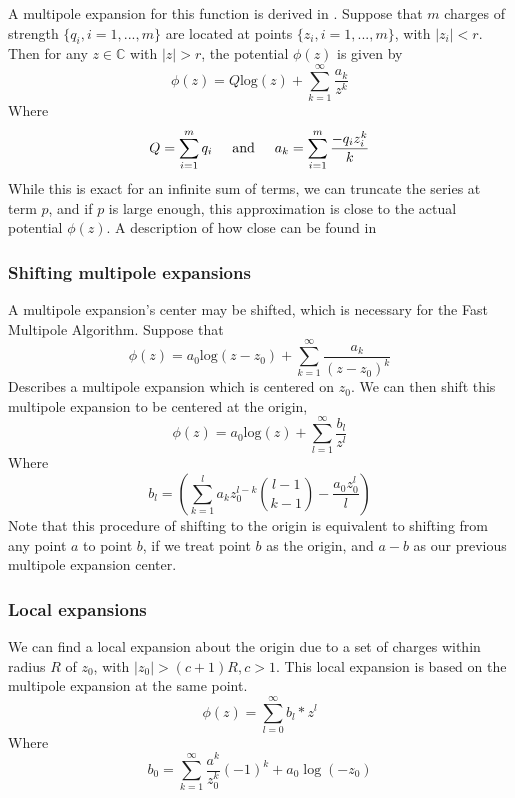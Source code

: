 \documentclass[pdftex,twoside,a4paper]{report}
\newcommand{\hs}{$\hspace{0.5cm}$}
\newcommand{\fma}{Fast Multipole Algorithm}
\begin{document}
A multipole expansion for this function is derived in \cite{greengard:315}. Suppose that $m$ charges of strength $\{q_i,i=1,...,m\}$ are located at points $\{z_i, i=1,...,m\}$, with $|z_i| < r$. Then for any $z \in \mathbb{C}$ with $|z| > r$, the potential $\phi(z)$ is given by
\begin{equation}
\phi(z) = Q \text{log}(z) + \sum_{k=1} ^{\infty} \frac{a_k}{z^k}
\label{eq:multipole_expansion}
\end{equation}
Where
\begin{equation}
Q = \sum_{i=1} ^m q_i 
\hspace{0.5cm} \text{and} \hspace{0.5cm}
a_k = \sum_{i=1} ^m \frac{-q_i z^k _i}{k}
\end{equation}
While this is exact for an infinite sum of terms, we can truncate the series at term $p$, and if $p$ is large enough, this approximation is close to the actual potential $\phi(z)$. A description of how close can be found in \cite{greengard:315}
\subsubsection{Shifting multipole expansions}
A multipole expansion's center may be shifted, which is necessary for the \fma{}. Suppose that
\begin{equation}
\phi(z) = a_0 \text{log}(z-z_0) + \sum_{k=1} ^{\infty} \frac{a_k}{(z-z_0)^k}
\label{eq:pre_shift_multipole}
\end{equation}
Describes a multipole expansion which is centered on $z_0$. We can then shift this multipole expansion to be centered at the origin,
\begin{equation}
\phi(z) = a_0 \text{log}(z) + \sum_{l=1} ^{\infty} \frac{b_l}{z^l}
\label{eq:shifted_multipole}
\end{equation}
Where
\begin{equation}
b_l = \left(\sum_{k=1} ^l a_k z_0^{l-k} \binom{l-1}{k-1} - \frac{a_0 z_0^l}{l} \right)
\label{eq:b_descr}
\end{equation}
Note that this procedure of shifting to the origin is equivalent to shifting from any point $a$ to point $b$, if we treat point $b$ as the origin, and $a-b$ as our previous multipole expansion center.
\subsubsection{Local expansions}
We can find a local expansion about the origin due to a set of charges within radius $R$ of $z_0$, with $|z_0| > (c+1)R, \hs c > 1$. This local expansion is based on the multipole expansion at the same point.
\begin{equation}
\phi(z) = \sum _{l=0} ^{\infty} b_l * z^l
\label{local_expansion}
\end{equation}
Where
\begin{equation}
b_0 = \sum_{k=1} ^{\infty} \frac{a^k}{z^k_0} (-1)^k + a_0 \log(-z_0)
\label{where_local_expansion}
\end{equation}
\end{document}
